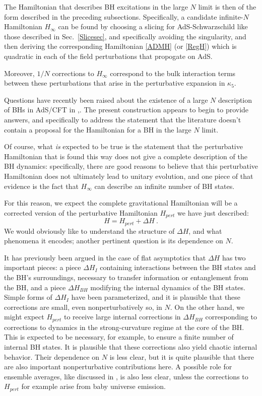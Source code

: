 \documentclass[12pt]{article}
\numberwithin{equation}{section}
\newcommand{\beq}{\begin{equation}}
\newcommand{\eeq}{\end{equation}}
\begin{document}
The Hamiltonian that describes BH excitations in the large $N$ limit is then of the form described in the preceding subsections.  Specifically, a candidate infinite-$N$ Hamiltonian $H_\infty$ can be found by choosing a slicing for AdS-Schwarzschild like those described in Sec.~\ref{Slicesec}, and specifically avoiding the singularity, and then deriving the corresponding  Hamiltonian \eqref{ADMH} (or \eqref{RegH}) which is quadratic in each of the field perturbations that propogate on AdS.  

Moreover, $1/N$ corrections to $H_\infty$ correspond to the bulk interaction terms between these perturbations that arise in the perturbative expansion in $\kappa_5$. 

Questions have recently been raised about the existence of a large $N$ description of BHs in AdS/CFT in \cite{WittQFT,Wittcross},\cite{ScWi}.  The present construction appears to begin to provide answers, and specifically to address the statement\cite{ScWi} that the literature doesn't contain a proposal for the Hamiltonian for a BH in the large $N$ limit.

Of course, what {\it is} expected to be true is the statement that the perturbative Hamiltonian that is found this way does not give a complete description of the BH dynamics:  specifically, there are good reasons to believe that this perturbative Hamiltonian does not ultimately lead to unitary evolution, and one piece of that evidence is the fact that $H_\infty$ can describe an infinite number of BH states.  

For this reason, we expect the complete gravitational Hamiltonian will be a corrected version of the perturbative Hamiltonian $H_{pert}$ we have just described:
\beq
H = H_{pert} + \Delta H\ .
\eeq
We would obviously like to understand the structure of $\Delta H$, and what phenomena it encodes; another pertinent question is its dependence on $N$.

It has previously been argued\cite{NVNL,NVNLT,NVU,BHQU} in the case of flat asymptotics that $\Delta H$ has two important pieces: a piece $\Delta H_I$ containing interactions between the BH states and the BH's surroundings, necessary to transfer information or entanglement from the BH, and a piece $\Delta H_{BH}$ modifying the internal dynamics of the BH states.  Simple forms of $\Delta H_I$ have been parameterized\cite{NVU}, and it is plausible that these corrections are small, even nonperturbatively so, in $N$.  On the other hand, we might expect $H_{pert}$ to receive large internal corrections in $\Delta H_{BH}$  corresponding to corrections to dynamics in the strong-curvature regime at the core of the BH.  
This is expected to be necessary, for example, to ensure a finite number of internal BH states.
It is plausible that these corrections also yield chaotic internal behavior.  Their dependence on $N$ is less clear, but it is quite plausible that there are also important nonperturbative contributions here.  A possible role for ensemble averages, like discussed in \cite{ScWi}, is also less clear, unless the corrections to $H_{pert}$ for example arise from baby universe emission\cite{Cole,GiSt,MaMa,GiTu,SGthm,HTY}.
\end{document}

